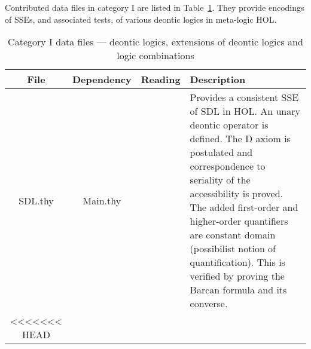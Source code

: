 \documentclass{article}
\begin{document}

Contributed data files in category I are listed in
Table~\ref{table:DeonticLogics}. They provide encodings of SSEs, and
associated tests, of various deontic logics in meta-logic HOL.

\setcounter{table}{0}
\begin{table}[ht!]
\caption{Category I data files --- deontic logics, extensions of
  deontic logics and logic combinations \label{table:DeonticLogics}}
\begin{tabularx}{\textwidth}{ccc*{1}{>{\raggedright\arraybackslash}X}}
  \toprule
  File & Dependency & Reading & Description \\
  \midrule
  \textsf{\small SDL.thy} 
       & \textsf{\small Main.thy} 
                    & \cite{J23,ddl:C80}  
                              & %
                                Provides a consistent SSE of SDL in
                                HOL. An unary deontic operator is
                                defined.
                                The D axiom is postulated and correspondence to seriality of the
                                accessibility is proved. The added
                                first-order and higher-order
                                quantifiers are constant domain
                                (possibilist notion of quantification). This is verified by proving
                                the Barcan formula and its converse. \\
  \midrule
<<<<<<< HEAD

\end{tabularx}
\end{table}
\end{document}
